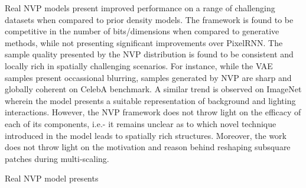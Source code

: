 \documentclass[11pt,letterpaper]{article}
\begin{document}
Real NVP models present improved performance on a range of challenging datasets when compared to prior density models. The framework is found to be competitive in the number of bits/dimensions when compared to generative methods, while not presenting significant improvements over PixelRNN. The sample quality presented by the NVP distribution is found to be consistent and locally rich in spatially challenging scenarios. For instance, while the VAE samples present occassional blurring, samples generated by NVP are sharp and globally coherent on CelebA benchmark. A similar trend is observed on ImageNet wherein the model presents a suitable representation of background and lighting interactions. However, the NVP framework does not throw light on the efficacy of each of its components, i.e.- it remains unclear as to which novel technique introduced in the model leads to spatially rich structures. Moreover, the work does not throw light on the motivation and reason behind reshaping subsquare patches during multi-scaling.

Real NVP model presents 
\end{document}
